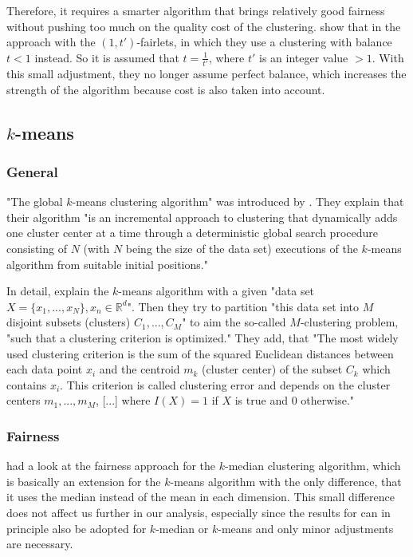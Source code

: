 Therefore, it requires a smarter algorithm that brings relatively good fairness without pushing too much on the quality cost of the clustering. \textcite[]{Chierichetti2018} show that in the approach with the $(1,t')$-fairlets, in which they use a clustering with balance $t < 1$ instead. So it is assumed that $t = \frac{1}{t'}$, where $t'$ is an integer value $> 1$. \autocite[6]{Chierichetti2018} With this small adjustment, they no longer assume perfect balance, which increases the strength of the algorithm because cost is also taken into account.


\subsection{$k$-means}
\label{k-means}

\subsubsection{General}

"The global $k$-means clustering algorithm" was introduced by \textcite[]{Likas2003}. They explain that their algorithm "is an incremental approach to clustering that dynamically adds one cluster center at a time through a deterministic global search procedure consisting of $N$ (with $N$ being the size of the data set) executions of the $k$-means algorithm from suitable initial positions." \autocite[1]{Likas2003}

In detail, \textcite[2]{Likas2003} explain the $k$-means algorithm with a given "data set $X = \{x_{1},...,x_{N}\},x_{n} \in \mathbb{R}^d$". Then they try to partition "this data set into $M$ disjoint subsets (clusters) $C_{1},...,C_{M}$" to aim the so-called $M$-clustering problem, "such that a clustering criterion is optimized." They add, that "The most widely used clustering criterion is the sum of the squared Euclidean distances between each data point $x_{i}$ and the centroid $m_{k}$ (cluster center) of the subset $C_{k}$ which contains $x_{i}$. This criterion is called clustering error and depends on the cluster centers $m_{1},...,m_{M}$, [...] where $I(X) = 1$ if $X$ is true and $0$ otherwise."

\subsubsection{Fairness}

\textcite[]{Chierichetti2018} had a look at the fairness approach for the $k$-median clustering algorithm, which is basically an extension for the $k$-means algorithm with the only difference, that it uses the median instead of the mean in each dimension. \autocite[]{Jain1988} This small difference does not affect us further in our analysis, especially since the results for  can in principle also be adopted for $k$-median or $k$-means and only minor adjustments are necessary.

